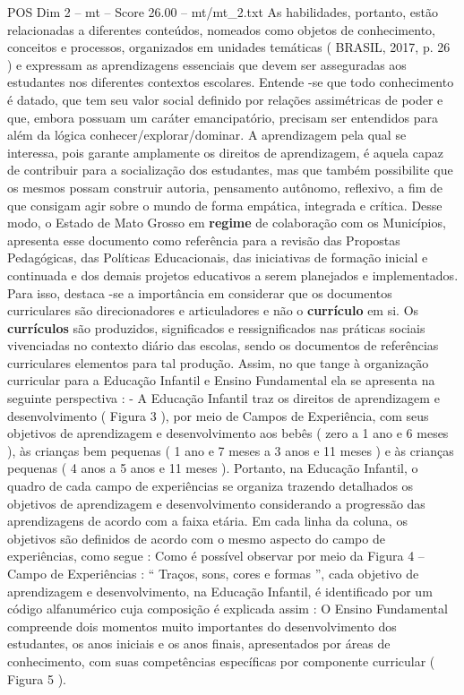 \begin{textsample}{POS Dim 2 – mt – Score 26.00 – mt/mt\_2.txt}
As habilidades, portanto, estão relacionadas a diferentes conteúdos, nomeados como objetos de conhecimento, conceitos e processos, organizados em unidades temáticas ( BRASIL, 2017, p. 26 ) e expressam as aprendizagens essenciais que devem ser asseguradas aos estudantes nos diferentes contextos escolares.
Entende -se que todo conhecimento é datado, que tem seu valor social definido por relações assimétricas de poder e que, embora possuam um caráter emancipatório, precisam ser entendidos para além da lógica conhecer/explorar/dominar.
A aprendizagem pela qual se interessa, pois garante amplamente os direitos de aprendizagem, é aquela capaz de contribuir para a socialização dos estudantes, mas que também possibilite que os mesmos possam construir autoria, pensamento autônomo, reflexivo, a fim de que consigam agir sobre o mundo de forma empática, integrada e crítica.
Desse modo, o Estado de Mato Grosso em \textbf{regime} de colaboração com os Municípios, apresenta esse documento como referência para a revisão das Propostas Pedagógicas, das Políticas Educacionais, das iniciativas de formação inicial e continuada e dos demais projetos educativos a serem planejados e implementados.
Para isso, destaca -se a importância em considerar que os documentos curriculares são direcionadores e articuladores e não o \textbf{currículo} em si.
Os \textbf{currículos} são produzidos, significados e ressignificados nas práticas sociais vivenciadas no contexto diário das escolas, sendo os documentos de referências curriculares elementos para tal produção.
Assim, no que tange à organização curricular para a Educação Infantil e Ensino Fundamental ela se apresenta na seguinte perspectiva : - A Educação Infantil traz os direitos de aprendizagem e desenvolvimento ( Figura 3 ), por meio de Campos de Experiência, com seus objetivos de aprendizagem e desenvolvimento aos bebês ( zero a 1 ano e 6 meses ), às crianças bem pequenas ( 1 ano e 7 meses a 3 anos e 11 meses ) e às crianças pequenas ( 4 anos a 5 anos e 11 meses ).
Portanto, na Educação Infantil, o quadro de cada campo de experiências se organiza trazendo detalhados os objetivos de aprendizagem e desenvolvimento considerando a progressão das aprendizagens de acordo com a faixa etária.
Em cada linha da coluna, os objetivos são definidos de acordo com o mesmo aspecto do campo de experiências, como segue : Como é possível observar por meio da Figura 4 – Campo de Experiências : “ Traços, sons, cores e formas ”, cada objetivo de aprendizagem e desenvolvimento, na Educação Infantil, é identificado por um código alfanumérico cuja composição é explicada assim : O Ensino Fundamental compreende dois momentos muito importantes do desenvolvimento dos estudantes, os anos iniciais e os anos finais, apresentados por áreas de conhecimento, com suas competências específicas por componente curricular ( Figura 5 ).

\end{textsample}
